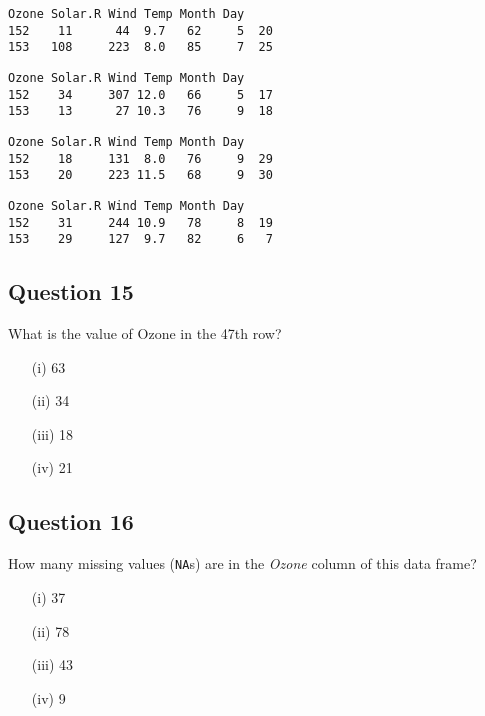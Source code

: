 \documentclass[12pt]{article}
\begin{document}
\begin{framed}
	\begin{verbatim}
Ozone Solar.R Wind Temp Month Day
152    11      44  9.7   62     5  20
153   108     223  8.0   85     7  25
	\end{verbatim}
\end{framed}
\begin{framed}
	\begin{verbatim}
Ozone Solar.R Wind Temp Month Day
152    34     307 12.0   66     5  17
153    13      27 10.3   76     9  18
	\end{verbatim}
\end{framed}
\begin{framed}
	\begin{verbatim}
Ozone Solar.R Wind Temp Month Day
152    18     131  8.0   76     9  29
153    20     223 11.5   68     9  30
	\end{verbatim}
\end{framed}
\begin{framed}
	\begin{verbatim}
Ozone Solar.R Wind Temp Month Day
152    31     244 10.9   78     8  19
153    29     127  9.7   82     6   7
	\end{verbatim}
\end{framed}

\newpage
\subsection*{Question 15}
\Large
What is the value of Ozone in the 47th row?
\begin{itemize}
\item[(i)] 63
\item[(ii)] 34
\item[(iii)] 18
\item[(iv)] 21
\end{itemize}

\newpage
\subsection*{Question 16}
\Large
How many missing values (\texttt{NA}s) are in the \textit{Ozone} column of this data frame?

\begin{itemize}
	\item[(i)] 37
	\item[(ii)] 78
	\item[(iii)] 43
	\item[(iv)] 9
\end{itemize}
\end{document}
